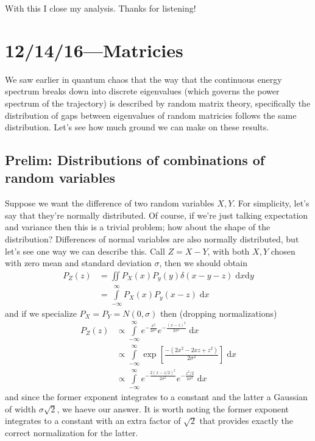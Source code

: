 \documentclass[12pt]{report}
\begin{document}
With this I close my analysis. Thanks for listening!

\chapter{12/14/16---Matricies}

We saw earlier in quantum chaos that the way that the continuous energy spectrum
breaks down into discrete eigenvalues (which governs the power spectrum of the
trajectory) is described by random matrix theory, specifically the distribution
of gaps between eigenvalues of random matricies follows the same distribution.
Let's see how much ground we can make on these results.

\section{Prelim: Distributions of combinations of random
variables}\label{s:rand_var_dist}

Suppose we want the difference of two random variables $X, Y$. For simplicity,
let's say that they're normally distributed. Of course, if we're just talking
expectation and variance then this is a trivial problem; how about the shape of
the distribution? Differences of normal variables are also normally distributed,
but let's see one way we can describe this. Call $Z = X - Y$, with both $X,Y$
chosen with zero mean and standard deviation $\sigma$, then we should obtain
\begin{align}
    P_Z(z) &= \iint P_X(x) P_y(y) \delta(x - y - z)\;\mathrm{d}x\mathrm{d}y\\
    &= \int\limits_{-\infty}^{\infty}P_X(x)P_y(x-z)\;\mathrm{d}x
\end{align}
and if we specialize $P_X = P_Y = N(0, \sigma)$ then (dropping normalizations)
\begin{align}
    P_Z(z) &\propto \int\limits_{-\infty}^{\infty}e^{-\frac{x^2}{2\sigma^2}}
        e^{-\frac{(x-z)^2}{2\sigma^2}}\;\mathrm{d}x\\
    &\propto \int\limits_{-\infty}^{\infty}
        \exp\left[ \frac{-(2x^2 - 2xz + z^2)}{2\sigma^2} \right]\;\mathrm{d}x\\
    &\propto \int\limits_{-\infty}^{\infty}e^{-\frac{2(x - z/2)^2}{2\sigma^2}}
        e^{-\frac{z^2/2}{2\sigma^2}}\;\mathrm{d}x
\end{align}
and since the former exponent integrates to a constant and the latter a Gaussian
of width $\sigma \sqrt{2}$, we haeve our answer. It is worth noting the former
exponent integrates to a constant with an extra factor of $\sqrt{2}$ that
provides exactly the correct normalization for the latter.
\end{document}
